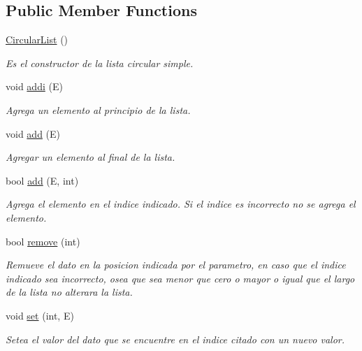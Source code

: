 \subsection*{Public Member Functions}
\begin{DoxyCompactItemize}
\item 
\hyperlink{class_circular_list_aad23571a808ede6fc0432dca645ab2ca}{Circular\-List} ()
\begin{DoxyCompactList}\small\item\em Es el constructor de la lista circular simple. \end{DoxyCompactList}\item 
void \hyperlink{class_circular_list_a275c75e142e791de9a1a00691af56a73}{addi} (E)
\begin{DoxyCompactList}\small\item\em Agrega un elemento al principio de la lista. \end{DoxyCompactList}\item 
void \hyperlink{class_circular_list_a892b493309f36fb083fdd257388cfa36}{add} (E)
\begin{DoxyCompactList}\small\item\em Agregar un elemento al final de la lista. \end{DoxyCompactList}\item 
bool \hyperlink{class_circular_list_af184d3ac2e3bba683a44a6cc19392b12}{add} (E, int)
\begin{DoxyCompactList}\small\item\em Agrega el elemento en el indice indicado. Si el indice es incorrecto no se agrega el elemento. \end{DoxyCompactList}\item 
bool \hyperlink{class_circular_list_a4a6acfd818a0ae9055957ec80258c60a}{remove} (int)
\begin{DoxyCompactList}\small\item\em Remueve el dato en la posicion indicada por el parametro, en caso que el indice indicado sea incorrecto, osea que sea menor que cero o mayor o igual que el largo de la lista no alterara la lista. \end{DoxyCompactList}\item 
void \hyperlink{class_circular_list_aa54489e11ad76bf929f92b1dce97a3a3}{set} (int, E)
\begin{DoxyCompactList}\small\item\em Setea el valor del dato que se encuentre en el indice citado con un nuevo valor. \end{DoxyCompactList}\item 

\end{DoxyCompactItemize}
